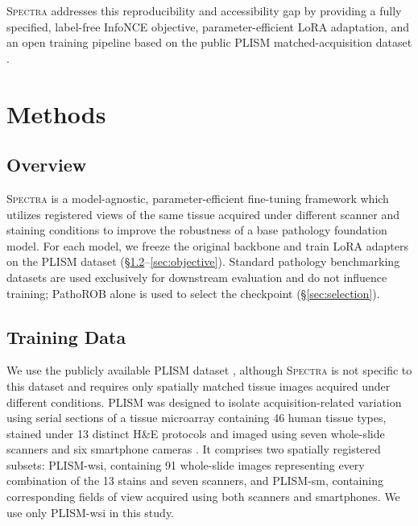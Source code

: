 \documentclass{article}
\begin{document}
\textsc{Spectra} addresses this reproducibility and accessibility gap by providing a fully specified, label-free InfoNCE objective, parameter-efficient LoRA adaptation, and an open training pipeline based on the public PLISM matched-acquisition dataset \citep{ochi2024plism}.

\section{Methods}
\label{sec:methods}

\subsection{Overview}

\textsc{Spectra} is a model-agnostic, parameter-efficient fine-tuning framework which utilizes registered views of the same tissue acquired under different scanner and staining conditions to improve the robustness of a base pathology foundation model. For each model, we freeze the original backbone and train LoRA adapters on the PLISM dataset (\S\ref{sec:data}--\ref{sec:objective}). Standard pathology benchmarking datasets are used exclusively for downstream evaluation and do not influence training; PathoROB alone is used to select the checkpoint (\S\ref{sec:selection}).

\subsection{Training Data}
\label{sec:data}

We use the publicly available PLISM dataset \citep{ochi2024plism}, although \textsc{Spectra} is not specific to this dataset and requires only spatially matched tissue images acquired under different conditions. PLISM was designed to isolate acquisition-related variation using serial sections of a tissue microarray containing 46 human tissue types, stained under 13 distinct H\&E protocols and imaged using seven whole-slide scanners and six smartphone cameras \citep{ochi2024plism}. It comprises two spatially registered subsets: PLISM-wsi, containing 91 whole-slide images representing every combination of the 13 stains and seven scanners, and PLISM-sm, containing corresponding fields of view acquired using both scanners and smartphones. We use only PLISM-wsi in this study.
\end{document}
